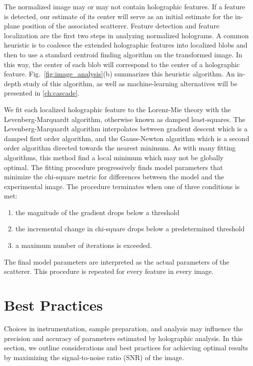 The normalized image may or may not contain holographic features. If a feature
is detected,
our estimate of its center will serve as an initial estimate
for the in-plane position of the associated scatterer.
Feature detection and feature localization are the first two steps in analyzing
normalized holograms. A common heuristic is to coalesce the
extended holographic features into localized blobs and then to use a standard
centroid finding algorithm\cite{crocker96} on the transformed image. In this way,
the center of each blob will correspond to the center of a holographic feature.
Fig.~\ref{fig:image_analysis}(b)
summarizes this heuristic algorithm. An in-depth study of this algorithm, as well
as machine-learning alternatives will be presented in \autoref{ch:cascade}.

We fit each localized holographic feature to the Lorenz-Mie theory
with the Levenberg-Marquardt algorithm, otherwise known as damped least-squares.
The Levenberg-Marquardt algorithm interpolates between gradient descent which is a damped
first order algorithm, and the Gauss-Newton algorithm which is a second order
algorithm directed towards the nearest minimum. As with many fitting algorithms,
this method find a local minimum which may not be globally optimal. The fitting
procedure progressively finds model parameters that minimize the
chi-square metric for differences between the model and the experimental image.
The procedure terminates when one of three conditions is met:
\begin{enumerate}
\item the magnitude of the gradient drops below a threshold
\item the incremental change in chi-square drops below a predetermined threshold
\item a maximum number of iterations is exceeded.
\end{enumerate}
The final model parameters are interpreted as the actual parameters of the
scatterer. This procedure is repeated for every feature in every image.

\section{Best Practices}

Choices in instrumentation, sample preparation, and analysis may influence
the precision and accuracy of parameters estimated by holographic
analysis. In this section, we outline considerations
and best practices for achieving optimal results by maximizing the
signal-to-noise ratio (SNR) of the image. 

